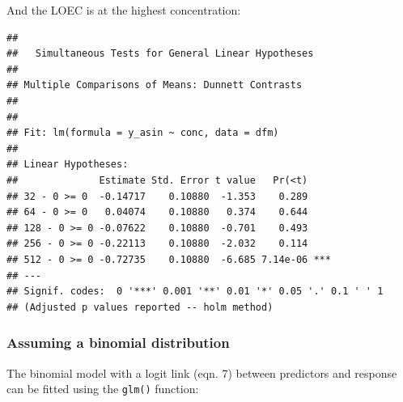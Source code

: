 And the LOEC is at the highest concentration:
\begin{knitrout}
\color{fgcolor}\begin{kframe}
\begin{alltt}
\hlstd{(}  \hlstd{=} \hlstd{(} \hlstd{=} \hlstd{),}  \hlstd{=} \hlstd{),}
         \hlstd{=} \hlstd{(}\hlstd{))}
\end{alltt}
\begin{verbatim}
## 
## 	 Simultaneous Tests for General Linear Hypotheses
## 
## Multiple Comparisons of Means: Dunnett Contrasts
## 
## 
## Fit: lm(formula = y_asin ~ conc, data = dfm)
## 
## Linear Hypotheses:
##              Estimate Std. Error t value   Pr(<t)    
## 32 - 0 >= 0  -0.14717    0.10880  -1.353    0.289    
## 64 - 0 >= 0   0.04074    0.10880   0.374    0.644    
## 128 - 0 >= 0 -0.07622    0.10880  -0.701    0.493    
## 256 - 0 >= 0 -0.22113    0.10880  -2.032    0.114    
## 512 - 0 >= 0 -0.72735    0.10880  -6.685 7.14e-06 ***
## ---
## Signif. codes:  0 '***' 0.001 '**' 0.01 '*' 0.05 '.' 0.1 ' ' 1
## (Adjusted p values reported -- holm method)
\end{verbatim}
\end{kframe}
\end{knitrout}


\subsubsection{Assuming a binomial distribution}
The binomial model with a logit link (eqn. 7) between predictors and response can be fitted using the \texttt{glm()} function:
\begin{knitrout}
\color{fgcolor}\begin{kframe}
\begin{alltt}
 \hlkwb{<-}  \hlopt{~}     \hlstd{=} \hlstd{(} \hlstd{=} \hlstd{),}
               \hlstd{=} \hlstd{(}\hlstd{,} 
\end{alltt}
\end{kframe}
\end{knitrout}

